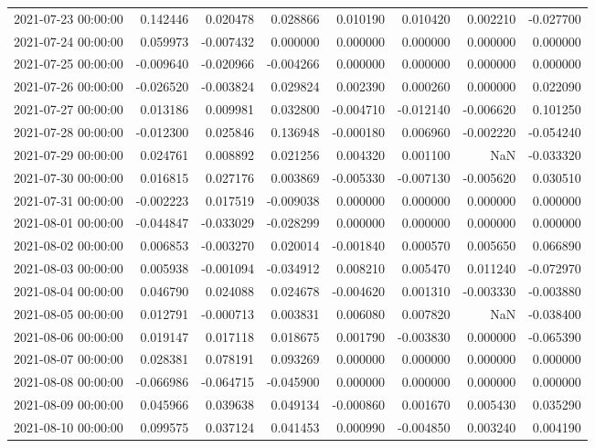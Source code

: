 \begin{tabular}{lrrrrrrr}
2021-07-23 00:00:00 & 0.142446 & 0.020478 & 0.028866 & 0.010190 & 0.010420 & 0.002210 & -0.027700 \\
2021-07-24 00:00:00 & 0.059973 & -0.007432 & 0.000000 & 0.000000 & 0.000000 & 0.000000 & 0.000000 \\
2021-07-25 00:00:00 & -0.009640 & -0.020966 & -0.004266 & 0.000000 & 0.000000 & 0.000000 & 0.000000 \\
2021-07-26 00:00:00 & -0.026520 & -0.003824 & 0.029824 & 0.002390 & 0.000260 & 0.000000 & 0.022090 \\
2021-07-27 00:00:00 & 0.013186 & 0.009981 & 0.032800 & -0.004710 & -0.012140 & -0.006620 & 0.101250 \\
2021-07-28 00:00:00 & -0.012300 & 0.025846 & 0.136948 & -0.000180 & 0.006960 & -0.002220 & -0.054240 \\
2021-07-29 00:00:00 & 0.024761 & 0.008892 & 0.021256 & 0.004320 & 0.001100 & NaN & -0.033320 \\
2021-07-30 00:00:00 & 0.016815 & 0.027176 & 0.003869 & -0.005330 & -0.007130 & -0.005620 & 0.030510 \\
2021-07-31 00:00:00 & -0.002223 & 0.017519 & -0.009038 & 0.000000 & 0.000000 & 0.000000 & 0.000000 \\
2021-08-01 00:00:00 & -0.044847 & -0.033029 & -0.028299 & 0.000000 & 0.000000 & 0.000000 & 0.000000 \\
2021-08-02 00:00:00 & 0.006853 & -0.003270 & 0.020014 & -0.001840 & 0.000570 & 0.005650 & 0.066890 \\
2021-08-03 00:00:00 & 0.005938 & -0.001094 & -0.034912 & 0.008210 & 0.005470 & 0.011240 & -0.072970 \\
2021-08-04 00:00:00 & 0.046790 & 0.024088 & 0.024678 & -0.004620 & 0.001310 & -0.003330 & -0.003880 \\
2021-08-05 00:00:00 & 0.012791 & -0.000713 & 0.003831 & 0.006080 & 0.007820 & NaN & -0.038400 \\
2021-08-06 00:00:00 & 0.019147 & 0.017118 & 0.018675 & 0.001790 & -0.003830 & 0.000000 & -0.065390 \\
2021-08-07 00:00:00 & 0.028381 & 0.078191 & 0.093269 & 0.000000 & 0.000000 & 0.000000 & 0.000000 \\
2021-08-08 00:00:00 & -0.066986 & -0.064715 & -0.045900 & 0.000000 & 0.000000 & 0.000000 & 0.000000 \\
2021-08-09 00:00:00 & 0.045966 & 0.039638 & 0.049134 & -0.000860 & 0.001670 & 0.005430 & 0.035290 \\
2021-08-10 00:00:00 & 0.099575 & 0.037124 & 0.041453 & 0.000990 & -0.004850 & 0.003240 & 0.004190 \\

\end{tabular}
